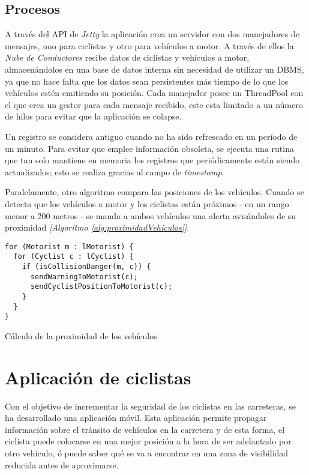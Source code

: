 \subsection{Procesos}\label{ssection:procesos}
A través del API de \emph{Jetty} la aplicación crea un servidor con dos manejadores de mensajes, uno para ciclistas y otro para vehículos a motor. A través de ellos la \emph{Nube de Conductores} recibe datos de ciclistas y vehículos a motor, almacenándolos en una base de datos interna sin necesidad de utilizar un DBMS, ya que no hace falta que los datos sean persistentes más tiempo de lo que los vehículos estén emitiendo su posición. Cada manejador posee un ThreadPool con el que crea un gestor para cada mensaje recibido, este esta limitado a un número de hilos para evitar que la aplicación se colapse. 

Un registro se considera antiguo cuando no ha sido refrescado en un período de un minuto. Para evitar que emplee información obsoleta, se ejecuta una rutina que tan solo mantiene en memoria los registros que periódicamente están siendo actualizados; esto se realiza gracias al campo de \emph{timestamp}.

Paralelamente, otro algoritmo compara las posiciones de los vehículos. Cuando se detecta que los vehículos a motor y los ciclistas están próximos - en un rango menor a 200 metros - se manda a ambos vehículos una alerta avisándoles de su proximidad \emph{[Algoritmo \ref{alg:proximidadVehiculos}]}.

\begin{listing}
	\begin{minipage}{.4\textwidth}
		\begin{verbatim}
for (Motorist m : lMotorist) {
  for (Cyclist c : lCyclist) {
    if (isCollisionDanger(m, c)) {
      sendWarningToMotorist(c);
      sendCyclistPositionToMotorist(c);
    }
  }
}
		\end{verbatim}
	\end{minipage}
	\caption{Cálculo de la proximidad de los vehículos}\label{alg:proximidadVehiculos}
\end{listing}
\section{Aplicación de ciclistas}\label{section:appCiclistas}
Con el objetivo de incrementar la seguridad de los ciclistas en las carreteras, se ha desarrollado una aplicación móvil. Esta aplicación permite propagar información sobre el tránsito de vehículos en la carretera y de esta forma, el ciclista puede colocarse en una mejor posición a la hora de ser adelantado por otro vehículo, ó puede saber qué se va a encontrar en una zona de visibilidad reducida antes de aproximarse.

